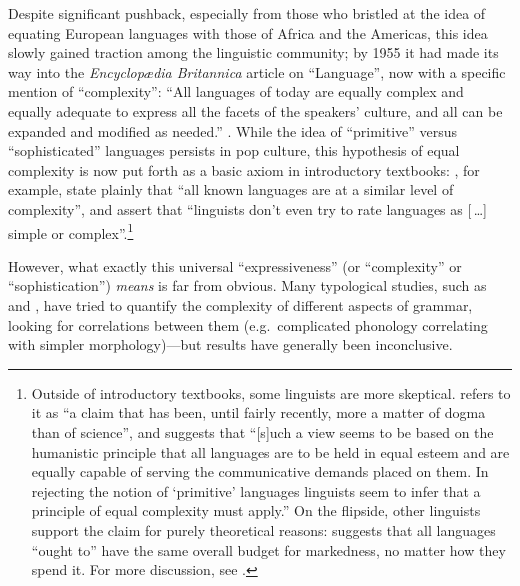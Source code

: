 \documentclass[12pt,twoside]{article}
\begin{document}
Despite significant pushback, especially from those who bristled at the idea of equating European languages with those of Africa and the Americas, this idea slowly gained traction among the linguistic community; by 1955 it had made its way into the \emph{Encyclopædia Britannica} article on ``Language'', now with a specific mention of ``complexity'': ``All languages of today are equally complex and equally adequate to express all the facets of the speakers' culture, and all can be expanded and modified as needed.'' \citep[698]{trager}. While the idea of ``primitive'' versus ``sophisticated'' languages persists in pop culture, this hypothesis of equal complexity is now put forth as a basic axiom in introductory textbooks: \citet[8]{akmajian}, for example, state plainly that ``all known languages are at a similar level of complexity'', and \citet[8]{ogrady} assert that ``linguists don't even try to rate languages as [\,\ldots{}] simple or complex''.\footnote{Outside of introductory textbooks, some linguists are more skeptical. \citet[2]{shosted} refers to it as ``a claim that has been, until fairly recently, more a matter of dogma than of science'', and \citet[216]{maddieson} suggests that ``[s]uch a view seems to be based on the humanistic principle that all languages are to be held in equal esteem and are equally capable of serving the communicative demands placed on them. In rejecting the notion of `primitive' languages linguists seem to infer that a principle of equal complexity must apply.'' On the flipside, other linguists support the claim for purely theoretical reasons: \citet[165-166]{chomsky} suggests that all languages ``ought to'' have the same overall budget for markedness, no matter how they spend it. For more discussion, see \citet{joseph}.}


However, what exactly this universal ``expressiveness'' (or ``complexity'' or ``sophistication'') \emph{means} is far from obvious. Many typological studies, such as \citet{maddieson} and \citet{shosted}, have tried to quantify the complexity of different aspects of grammar, looking for correlations between them (e.g.\ complicated phonology correlating with simpler morphology)---but results have generally been inconclusive.
\end{document}
